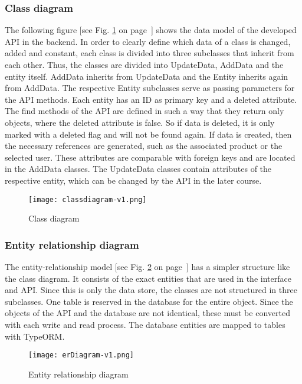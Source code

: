     \subsubsection*{Class diagram}
    The following figure [see Fig. \ref{fig: classdiagram} on page~\pageref{fig: classdiagram}] shows the data model of the developed API in the backend. In order to clearly define which data of a class is changed, added and constant, each class is divided into three subclasses that inherit from each other. Thus, the classes are divided into UpdateData, AddData and the entity itself. AddData inherits from UpdateData and the Entity inherits again from AddData. The respective Entity subclasses serve as passing parameters for the API methods. Each entity has an ID as primary key and a deleted attribute. The find methods of the API are defined in such a way that they return only objects, where the deleted attribute is false. So if data is deleted, it is only marked with a deleted flag and will not be found again. If data is created, then the necessary references are generated, such as the associated product or the selected user. These attributes are comparable with foreign keys and are located in the AddData classes. The UpdateData classes contain attributes of the respective entity, which can be changed by the API in the later course. 

    \begin{figure}[h]
        \centering
        \texttt{[image: classdiagram-v1.png]}
        \caption{Class diagram}
        \label{fig: classdiagram}
    \end{figure}

    \subsubsection*{Entity relationship diagram} %
    The entity-relationship model [see Fig. \ref{fig: erDiagram} on page~\pageref{fig: erDiagram}] has a simpler structure like the class diagram. It consists of the exact entities that are used in the interface and API. Since this is only the data store, the classes are not structured in three subclasses. One table is reserved in the database for the entire object. Since the objects of the API and the database are not identical, these must be converted with each write and read process. The database entities are mapped to tables with TypeORM. 

    \begin{figure}[h]
        \centering
        \texttt{[image: erDiagram-v1.png]}
        \caption{Entity relationship diagram}
        \label{fig: erDiagram}
    \end{figure}

